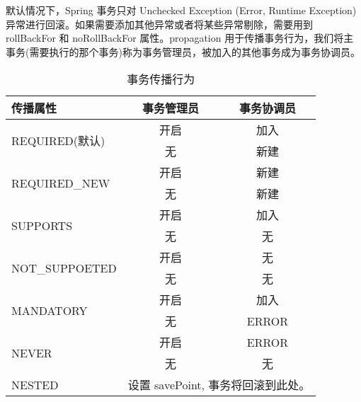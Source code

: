 默认情况下，Spring 事务只对 Unchecked Exception (Error, Runtime Exception)异常进行回滚。如果需要添加其他异常或者将某些异常剔除，需要用到 rollBackFor 和 noRollBackFor 属性。propagation 用于传播事务行为，我们将主事务(需要执行的那个事务)称为事务管理员，被加入的其他事务成为事务协调员。

\begin{table}[H]
    \centering
    \small
    \caption{事务传播行为}
    \label{table:事务传播行为}
    \setlength{\tabcolsep}{4mm}
    \begin{tabular}{l|c|c}
        \toprule
        \textbf{传播属性} & \textbf{事务管理员} & \textbf{事务协调员} \\
        \midrule
        \multirow{2}{*}{REQUIRED(默认)} & 开启 & 加入 \\
         & 无 & 新建 \\
        \midrule
        \multirow{2}{*}{REQUIRED\_NEW} & 开启 & 新建 \\
        & 无 & 新建 \\
        \midrule
        \multirow{2}{*}{SUPPORTS} & 开启 & 加入 \\
        & 无 & 无 \\
        \midrule
        \multirow{2}{*}{NOT\_SUPPOETED} & 开启 & 无 \\
        & 无 & 无 \\
        \midrule
        \multirow{2}{*}{MANDATORY} & 开启 & 加入 \\
        & 无 & ERROR \\
        \midrule
        \multirow{2}{*}{NEVER} & 开启 & ERROR \\
        & 无 & 无 \\
        \midrule
        NESTED & \multicolumn{2}{l}{设置 savePoint, 事务将回滚到此处。} \\
        \bottomrule
    \end{tabular}
\end{table}

\newpage